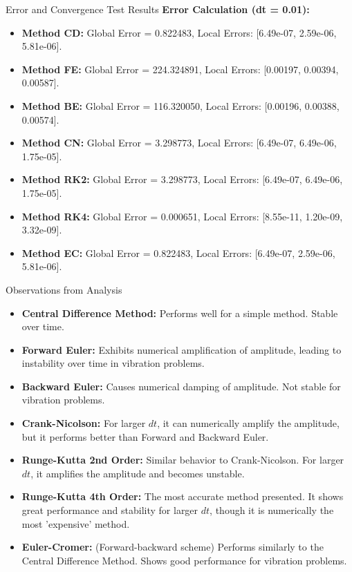 \documentclass[10pt, aspectratio=54]{beamer}
\begin{document}
\begin{frame}[fragile]{Error and Convergence Test Results}
	\textbf{Error Calculation (dt = 0.01):}
	\begin{itemize}
		\item \textbf{Method CD:} Global Error = 0.822483, Local Errors: [6.49e-07, 2.59e-06, 5.81e-06].
		\item \textbf{Method FE:} Global Error = 224.324891, Local Errors: [0.00197, 0.00394, 0.00587].
		\item \textbf{Method BE:} Global Error = 116.320050, Local Errors: [0.00196, 0.00388, 0.00574].
		\item \textbf{Method CN:} Global Error = 3.298773, Local Errors: [6.49e-07, 6.49e-06, 1.75e-05].
		\item \textbf{Method RK2:} Global Error = 3.298773, Local Errors: [6.49e-07, 6.49e-06, 1.75e-05].
		\item \textbf{Method RK4:} Global Error = 0.000651, Local Errors: [8.55e-11, 1.20e-09, 3.32e-09].
		\item \textbf{Method EC:} Global Error = 0.822483, Local Errors: [6.49e-07, 2.59e-06, 5.81e-06].
	\end{itemize}
\end{frame}


\begin{frame}[fragile]{Observations from Analysis}
	\begin{itemize}
		\item \textbf{Central Difference Method:} Performs well for a simple method. Stable over time.
		\item \textbf{Forward Euler:} Exhibits numerical amplification of amplitude, leading to instability over time in vibration problems.
		\item \textbf{Backward Euler:} Causes numerical damping of amplitude. Not stable for vibration problems.
		\item \textbf{Crank-Nicolson:} For larger \( dt \), it can numerically amplify the amplitude, but it performs better than Forward and Backward Euler.
		\item \textbf{Runge-Kutta 2nd Order:} Similar behavior to Crank-Nicolson. For larger \( dt \), it amplifies the amplitude and becomes unstable.
		\item \textbf{Runge-Kutta 4th Order:} The most accurate method presented. It shows great performance and stability for larger \( dt \), though it is numerically the most 'expensive' method.
		\item \textbf{Euler-Cromer:} (Forward-backward scheme) Performs similarly to the Central Difference Method. Shows good performance for vibration problems.
	\end{itemize}
\end{frame}
\end{document}

